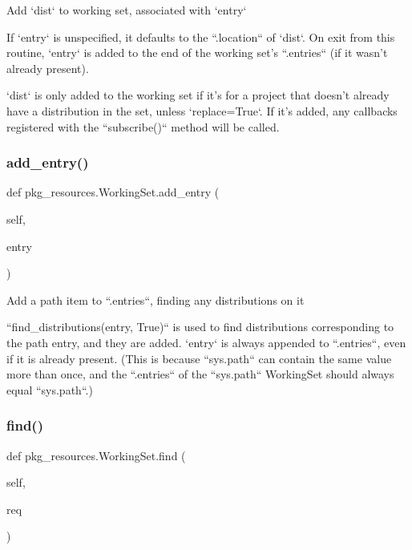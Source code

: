 \begin{DoxyVerb}Add `dist` to working set, associated with `entry`

If `entry` is unspecified, it defaults to the ``.location`` of `dist`.
On exit from this routine, `entry` is added to the end of the working
set's ``.entries`` (if it wasn't already present).

`dist` is only added to the working set if it's for a project that
doesn't already have a distribution in the set, unless `replace=True`.
If it's added, any callbacks registered with the ``subscribe()`` method
will be called.
\end{DoxyVerb}
 \mbox{\label{classpkg__resources_1_1_working_set_aed20abcb6a85cdc25dff1686ad480958}} 
\subsubsection{\texorpdfstring{add\+\_\+entry()}{add\_entry()}}
{\footnotesize\ttfamily def pkg\+\_\+resources.\+Working\+Set.\+add\+\_\+entry (\begin{DoxyParamCaption}\item[{}]{self,  }\item[{}]{entry }\end{DoxyParamCaption})}

\begin{DoxyVerb}Add a path item to ``.entries``, finding any distributions on it

``find_distributions(entry, True)`` is used to find distributions
corresponding to the path entry, and they are added.  `entry` is
always appended to ``.entries``, even if it is already present.
(This is because ``sys.path`` can contain the same value more than
once, and the ``.entries`` of the ``sys.path`` WorkingSet should always
equal ``sys.path``.)
\end{DoxyVerb}
 \mbox{\label{classpkg__resources_1_1_working_set_a4eb8b69f25d05e0edb4f2a8d162d096b}} 
\subsubsection{\texorpdfstring{find()}{find()}}
{\footnotesize\ttfamily def pkg\+\_\+resources.\+Working\+Set.\+find (\begin{DoxyParamCaption}\item[{}]{self,  }\item[{}]{req }\end{DoxyParamCaption})}

